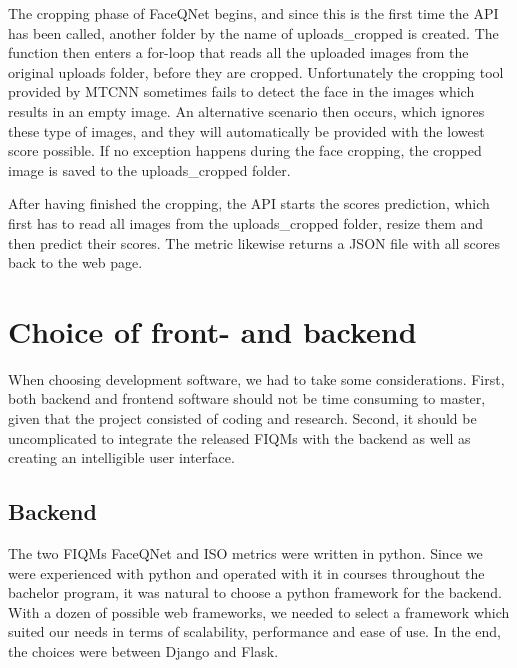The cropping phase of FaceQNet begins, and since this is the first time the API has been called, another folder by the name of uploads\_cropped is created. The function then enters a for-loop that reads all the uploaded images from the original uploads folder, before they are cropped. Unfortunately the cropping tool provided by MTCNN sometimes fails to detect the face in the images which results in an empty image. An alternative scenario then occurs, which ignores these type of images, and they will automatically be provided with the lowest score possible. If no exception happens during the face cropping, the cropped image is saved to the uploads\_cropped folder.  

After having finished the cropping, the API starts the scores prediction, which first has to read all images from the uploads\_cropped folder, resize them and then predict their scores. The metric likewise returns a JSON file with all scores back to the web page. 

\section{Choice of front- and backend}
When choosing development software, we had to take some considerations. First, both backend and frontend software should not be time consuming to master, given that the project consisted of coding and research. Second, it should be uncomplicated to integrate the released FIQMs with the backend as well as creating an intelligible user interface. 

\subsection*{Backend}
The two FIQMs FaceQNet and ISO metrics were written in python. Since we were experienced with python and operated with it in courses throughout the bachelor program, it was natural to choose a python framework for the backend. With a dozen of possible web frameworks, we needed to select a framework which suited our needs in terms of scalability, performance and ease of use. In the end, the choices were between Django and Flask. 

\newpage

